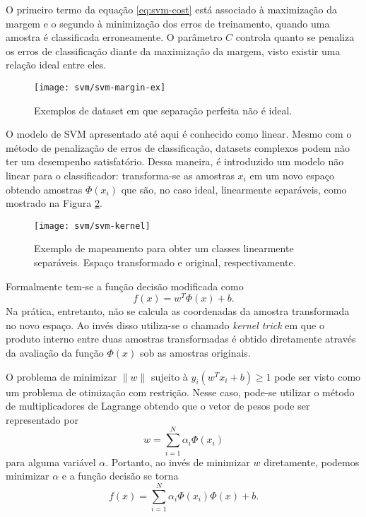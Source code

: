 O primeiro termo da equação \eqref{eq:svm-cost} está associado à maximização da margem e o segundo à minimização dos erros de treinamento, quando uma amostra é classificada erroneamente. O parâmetro $C$ controla quanto se penaliza os erros de classificação diante da maximização da margem, visto existir uma relação ideal entre eles.

\begin{figure}
\centering
\texttt{[image: svm/svm-margin-ex]}
\caption{Exemplos de dataset em que separação perfeita não é ideal.}
\label{fig:svm-margin-ex}
\end{figure}

O modelo de SVM apresentado até aqui é conhecido como linear. Mesmo com o método de penalização de erros de classificação, datasets complexos podem não ter um desempenho satisfatório. Dessa maneira, é introduzido um modelo não linear para o classificador: transforma-se as amostras $x_i$ em um novo espaço obtendo amostras $\Phi(x_i)$ que são, no caso ideal, linearmente separáveis, como mostrado na Figura \ref{fig:svm-kernel}.

\begin{figure}
\centering
\texttt{[image: svm/svm-kernel]}
\caption{Exemplo de mapeamento para obter um classes linearmente separáveis. Espaço transformado e original, respectivamente.}
\label{fig:svm-kernel}
\end{figure}

Formalmente \cite{bishop2007} tem-se a função decisão modificada como
\begin{equation*}
f(x)=w^T \Phi(x) +b.
\end{equation*}
Na prática, entretanto, não se calcula as coordenadas da amostra transformada no novo espaço. Ao invés disso utiliza-se o chamado \textit{kernel trick} \cite{bishop2007} em que o produto interno entre duas amostras transformadas é obtido diretamente através da avaliação da função $\Phi(x)$ sob as amostras originais.

O problema de minimizar $\|w\|$ sujeito à $y_i(w^T x_i+b) \geq 1$ pode ser visto como um problema de otimização com restrição. Nesse caso, pode-se utilizar o método de multiplicadores de Lagrange \cite{bishop2007} obtendo que o vetor de pesos pode ser representado por
\begin{equation}
	w=\sum_{i=1}^N \alpha_i \Phi(x_i)
\end{equation}
para alguma variável $\alpha$. Portanto, ao invés de minimizar $w$ diretamente, podemos minimizar $\alpha$ e a função decisão se torna
\begin{equation}
	\label{eq:svm-decision-func}
	f(x)=\sum_{i=1}^N \alpha_i \Phi(x_i) \Phi(x) +b.
\end{equation}

